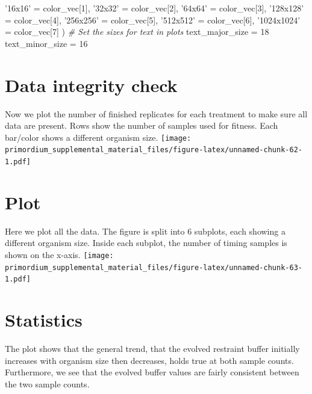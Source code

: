 \documentclass[]{book}
\newenvironment{Shaded}{\begin{snugshade}}{\end{snugshade}}
\newcommand{\CommentTok}[1]{\textcolor[rgb]{0.56,0.35,0.01}{\textit{#1}}}
\newcommand{\DecValTok}[1]{\textcolor[rgb]{0.00,0.00,0.81}{#1}}
\newcommand{\NormalTok}[1]{#1}
\newcommand{\StringTok}[1]{\textcolor[rgb]{0.31,0.60,0.02}{#1}}
\begin{document}
\begin{Shaded}
\begin{Highlighting}[]
  \StringTok{'16x16'}\NormalTok{ =}\StringTok{     }\NormalTok{color_vec[}\DecValTok{1}\NormalTok{],}
  \StringTok{'32x32'}\NormalTok{ =}\StringTok{     }\NormalTok{color_vec[}\DecValTok{2}\NormalTok{],}
  \StringTok{'64x64'}\NormalTok{ =}\StringTok{     }\NormalTok{color_vec[}\DecValTok{3}\NormalTok{],}
  \StringTok{'128x128'}\NormalTok{ =}\StringTok{   }\NormalTok{color_vec[}\DecValTok{4}\NormalTok{],}
  \StringTok{'256x256'}\NormalTok{ =}\StringTok{   }\NormalTok{color_vec[}\DecValTok{5}\NormalTok{],}
  \StringTok{'512x512'}\NormalTok{ =}\StringTok{   }\NormalTok{color_vec[}\DecValTok{6}\NormalTok{],}
  \StringTok{'1024x1024'}\NormalTok{ =}\StringTok{ }\NormalTok{color_vec[}\DecValTok{7}\NormalTok{]}
\NormalTok{)}
\CommentTok{# Set the sizes for text in plots}
\NormalTok{text_major_size =}\StringTok{ }\DecValTok{18}
\NormalTok{text_minor_size =}\StringTok{ }\DecValTok{16} 
\end{Highlighting}
\end{Shaded}

\hypertarget{data-integrity-check-3}{%
\section{Data integrity check}\label{data-integrity-check-3}}

Now we plot the number of finished replicates for each treatment to make sure all data are present.
Rows show the number of samples used for fitness.
Each bar/color shows a different organism size.
\texttt{[image: primordium\_supplemental\_material\_files/figure-latex/unnamed-chunk-62-1.pdf]}

\hypertarget{plot}{%
\section{Plot}\label{plot}}

Here we plot all the data.
The figure is split into 6 subplots, each showing a different organism size.
Inside each subplot, the number of timing samples is shown on the x-axis.
\texttt{[image: primordium\_supplemental\_material\_files/figure-latex/unnamed-chunk-63-1.pdf]}

\hypertarget{statistics-3}{%
\section{Statistics}\label{statistics-3}}

The plot shows that the general trend, that the evolved restraint buffer initially increases with organism size then decreases, holds true at both sample counts.
Furthermore, we see that the evolved buffer values are fairly consistent between the two sample counts.
\end{document}
